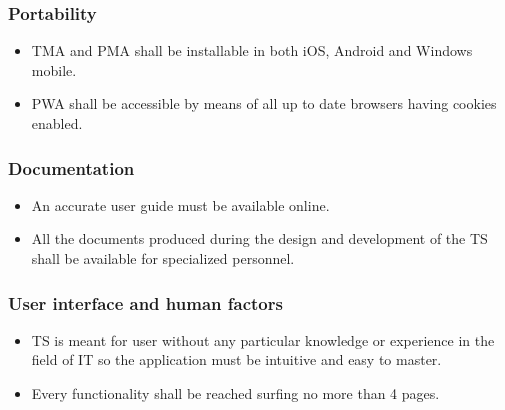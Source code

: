 \subsubsection{Portability }
\begin{itemize}
\item TMA and PMA shall be installable in both iOS, Android and Windows
mobile.
\item PWA shall be accessible by means of all up to date browsers having
cookies enabled.
\end{itemize}

\subsubsection{Documentation}
\begin{itemize}
\item An accurate user guide must be available online.
\item All the documents produced during the design and development of the
TS shall be available for specialized personnel.
\end{itemize}

\subsubsection{User interface and human factors }
\begin{itemize}
\item TS is meant for user without any particular knowledge or experience
in the field of IT so the application must be intuitive and easy to
master.
\item Every functionality shall be reached surfing no more than 4 pages.\end{itemize}

